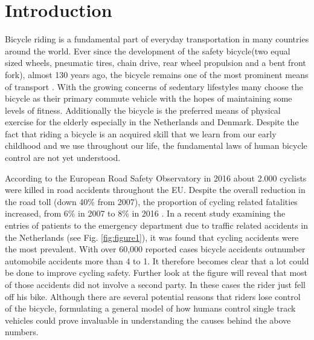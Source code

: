 \chapter{Introduction}
\label{introduction}

Bicycle riding is a fundamental part of everyday transportation in many countries around the world. Ever since the development of the safety bicycle(two equal sized wheels, pneumatic tires, chain drive, rear wheel propulsion and a bent front fork), almost 130 years ago, the bicycle remains  one of the most prominent means of transport \cite{kooijman2013review}. With the growing concerns of sedentary lifestyles many choose the bicycle as their primary commute vehicle with the hopes of maintaining some levels of fitness. Additionally the bicycle is the preferred means of physical exercise for the elderly especially in the Netherlands and Denmark. Despite the fact that riding a bicycle is an acquired skill that we learn from our early childhood and we use throughout our life, the fundamental laws of human bicycle control are not yet understood.
\par

According to the European Road Safety Observatory \cite{eu2018cycle} in 2016 about 2.000 cyclists
were killed in road accidents throughout the EU. Despite the overall reduction in the road toll (down 40\% from 2007), the proportion of cycling related fatalities increased, from 6\% in 2007 to 8\% in 2016 \cite{eu2018cycle}. In a recent study examining the entries of patients to the emergency department due to traffic related accidents in the Netherlands (see Fig. \ref{fig:figure1}), it was found that cycling accidents were the most prevalent. With over 60,000 reported cases  bicycle accidents outnumber automobile accidents more than 4 to 1. It therefore  becomes clear that a lot could be done to improve cycling safety. Further look at the figure will reveal that most of those accidents did not involve a second party. In these cases the rider just fell off his bike. Although there are several potential reasons that riders lose control of the bicycle, formulating a general model of  how humans control single track vehicles could prove invaluable in understanding the causes behind the above numbers.

